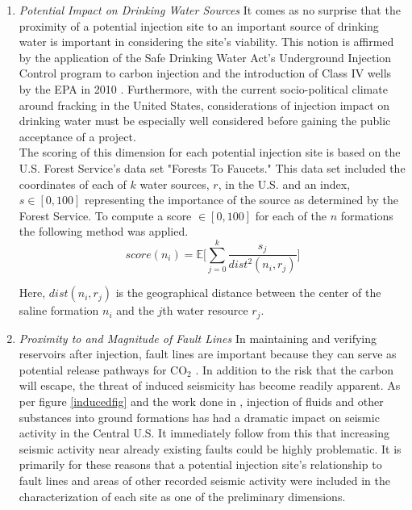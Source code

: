 \documentclass[letterpaper, 12pt]{article}
\begin{document}
\begin{enumerate}
\item \emph{Potential Impact on Drinking Water Sources} It comes as no surprise that the proximity of a potential injection site to an important source of drinking water is important in considering the site's viability.  This notion is affirmed by the application of the Safe Drinking Water Act's Underground Injection Control program to carbon injection and the introduction of Class IV wells by the EPA in 2010 \cite{natcarb_risk}. Furthermore, with the current socio-political climate around fracking in the United States, considerations of injection impact on drinking water must be especially well considered before gaining the public acceptance of a project. \\
The scoring of this dimension for each potential injection site is based on the U.S. Forest Service's data set "Forests To Faucets." This data set included the coordinates of each of $k$ water sources, $r$, in the U.S. and an index, $s \in [0, 100]$ representing the importance of the source as determined by the Forest Service. To compute a score $\in [0, 100]$ for each of the $n$ formations the following method was applied. 
$$score(n_i) =  \mathbb{E}\bigg[\sum_{j=0}^k \frac{s_j}{dist^2(n_i, r_j)}\bigg]$$

Here, $dist(n_i, r_j)$ is the geographical distance between the center of the saline formation $n_i$ and the $j$th water resource $r_j$. 

\item \emph{Proximity to and Magnitude of Fault Lines} In maintaining and verifying reservoirs after injection, fault lines are important because they can serve as potential release pathways for CO$_2$ \cite{natcarb_risk}. In addition to the risk that the carbon will escape, the threat of induced seismicity has become readily apparent. As per figure \ref{inducedfig} and the work done in \cite{seis_induced}, injection of fluids and other substances into ground formations has had a dramatic impact on seismic activity in the Central U.S. It immediately follow from this that increasing seismic activity near already existing faults could be highly problematic. It is primarily for these reasons that a potential injection site's relationship to fault lines and areas of other recorded seismic activity were included in the characterization of each site as one of the preliminary dimensions. 


\end{enumerate}
\end{document}
